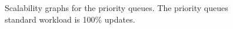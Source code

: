 \begin{figure}[tbp]
  \centering
  \caption{Scalability graphs for the priority queues. The priority queues standard workload is 100\% updates.}
  \label{fig:priorityqueues}
\end{figure}

